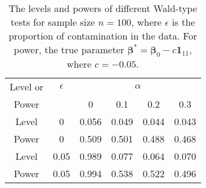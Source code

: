 \documentclass[a4paper]{article}%
\begin{document}
%
%


\begin{table}[h]
	\caption{The levels and powers of different Wald-type tests for sample size $n=100$, where $\epsilon$ is the proportion of contamination in the data. For power, the true parameter  $\boldsymbol{\beta}^* = \boldsymbol{\beta}_0 - c \boldsymbol{1}_{11}$, where $c = - 0.05$.}%
	\label{TAB:sim}
	\centering
	\begin{tabular}
		[c]{|c|c|cccc|}\hline
		Level or & $\epsilon$  &
		\multicolumn{4}{c|}{$\alpha$}\\
		Power &  & 0  & 0.1 & 0.2 & 0.3 \\ \hline
		Level & 0 & 0.056 &	0.049 &	0.044 &	0.043\\
		Power & 0 & 0.509 & 0.501 & 0.488 & 0.468\\
		Level & 0.05 & 0.989 &	0.077 &	0.064 &	0.070\\
		Power & 0.05 & 0.994 &	0.538 &	0.522 &	0.496\\
		\hline
	\end{tabular}
\end{table}
\end{document}
